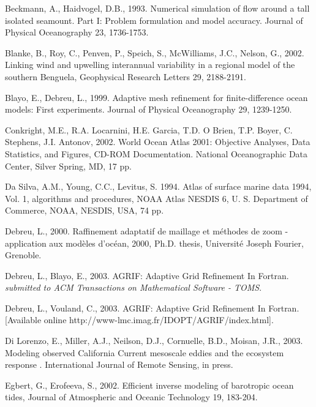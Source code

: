 Beckmann, A., Haidvogel, D.B.,
1993.
Numerical simulation of flow around a tall
isolated seamount. Part I: Problem formulation
and model accuracy.
Journal of Physical Oceanography
23,
1736-1753.

Blanke, B., Roy, C., Penven, P., Speich, S., 
McWilliams, J.C., Nelson, G.,
2002.
Linking wind and upwelling interannual variability in a
regional model of the southern Benguela,
Geophysical Research Letters
29,
2188-2191.

Blayo, E., Debreu, L.,
1999.
Adaptive mesh refinement for finite-difference
ocean models: First experiments.
Journal of Physical Oceanography
29,
1239-1250.

Conkright, M.E., R.A. Locarnini, H.E. Garcia, T.D. O Brien, 
T.P. Boyer, C. Stephens, J.I. Antonov, 2002. 
World Ocean Atlas 2001: Objective Analyses, Data Statistics, 
and Figures, CD-ROM Documentation. 
National Oceanographic Data Center, 
Silver Spring, MD, 
17 pp.

Da Silva, A.M., Young, C.C., Levitus, S.
1994.
Atlas of surface marine data 1994,
Vol. 1,
algorithms and procedures,
NOAA Atlas NESDIS 6,
U. S. Department of Commerce,
NOAA,
NESDIS,
USA,
74 pp.

Debreu, L.,
2000.
Raffinement adaptatif de maillage et m\'ethodes de zoom -
application aux mod\`eles d'oc\'ean,
2000,
Ph.D. thesis,
Universit\'e Joseph Fourier,
Grenoble.

Debreu, L., Blayo, E.,
2003.
AGRIF: Adaptive Grid Refinement In Fortran.
{\it submitted to ACM Transactions on Mathematical Software - TOMS}.

Debreu, L., Vouland, C.,
2003.
AGRIF: Adaptive Grid Refinement In Fortran.
[Available online http://www-lmc.imag.fr/IDOPT/AGRIF/index.html].

Di Lorenzo, E., Miller, A.J., Neilson, D.J., 
Cornuelle, B.D., Moisan, J.R.,
2003.
Modeling observed California Current mesoscale eddies and 
the ecosystem response .
International Journal of Remote Sensing,
in press.

Egbert, G., Erofeeva, S., 2002.
Efficient inverse modeling of barotropic ocean tides, 
Journal of Atmospheric and Oceanic Technology
19,
183-204.

